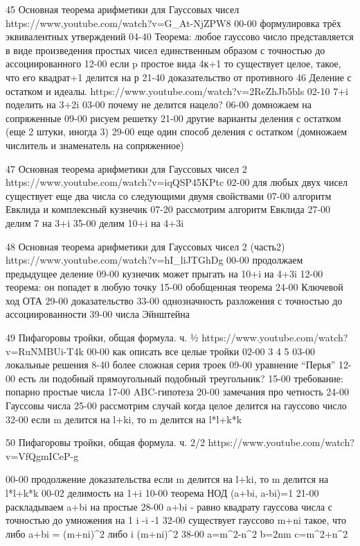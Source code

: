 45
Основная теорема арифметики для Гауссовых чисел
https://www.youtube.com/watch?v=G_At-NjZPW8
00-00 формулировка трёх эквивалентных утверждений
04-40 Теорема: любое гауссово число представляется в виде произведения простых чисел единственным образом с точностью до ассоциированного
12-00 если p простое вида 4к+1 то существует целое, такое, что его квадрат+1 делится на р
21-40 доказательство от противного
46
Деление с остатком и идеалы.
https://www.youtube.com/watch?v=2ReZhJb5bls
02-10 7+i поделить на 3+2i
03-00 почему не делится нацело?
06-00 домножаем на сопряженные
09-00 рисуем решетку 
21-00 другие варианты деления с остатком (еще 2 штуки, иногда 3)
29-00 еще один способ деления с остатком (домножаем числитель и знаменатель на сопряженное)

47
Основная теорема арифметики для Гауссовых чисел 2
https://www.youtube.com/watch?v=iqQSP45KPtc
02-00 для любых двух чисел существует еще два числа со следующими двумя свойствами
07-00 алгоритм Евклида и комплексный кузнечик
07-20 рассмотрим алгоритм Евклида
27-00 делим 7 на 3+i
35-00 делим 10+i на 4+3i

48
Основная теорема арифметики для Гауссовых чисел 2 (часть2)
https://www.youtube.com/watch?v=hI_liJTGhDg
00-00 продолжаем предыдущее деление
09-00 кузнечик может прыгать на 10+i на 4+3i
12-00 теорема: он попадет в любую точку
15-00 обобщенная теорема
24-00 Ключевой ход ОТА
29-00 доказательство
33-00 однозначность разложения с точностью до ассоциированности
39-00 числа Эйнштейна

49
Пифагоровы тройки, общая формула. ч. ½
https://www.youtube.com/watch?v=RuNMBUi-T4k
00-00 как описать все целые тройки
02-00 3 4 5
03-00 локальные решения
8-40 более сложная серия троек
09-00 уравнение “Перья”
12-00 есть ли подобный прямоугольный подобный треугольник?
15-00 требование: попарно простые числа
17-00 ABC-гипотеза
20-00 замечания про четность
24-00 Гауссовы числа
25-00 рассмотрим случай когда целое делится на гауссово число
32-00 если m делится на l+ki, то  m делится на l*l+k*k

50
Пифагоровы тройки, общая формула. ч. 2/2
https://www.youtube.com/watch?v=VfQgmICeP-g

00-00 продолжение доказательства если m делится на l+ki, то  m делится на l*l+k*k
00-02 делимость на 1+i
10-00 теорема НОД (a+bi, a-bi)=1
21-00 раскладываем a+bi на простые
28-00 a+bi - равно квадрату гауссова числа с точностью до умножения на {1 i -i -1}
32-00 существует гауссово m+ni такое, что либо a+bi = (m+ni)^2 либо i (m+ni)^2
38-00 a=m^2-n^2 b=2nm c=m^2+n^2

